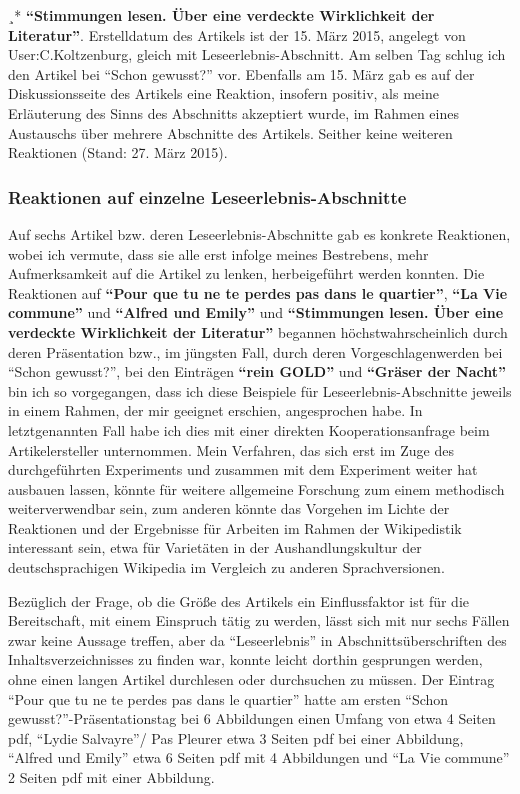 \documentclass[fontsize=12pt]{scrartcl}
\begin{document}
¸* \textbf{"`Stimmungen lesen. \"Uber eine verdeckte Wirklichkeit der Li\-te\-ra\-tur"'}. Erstelldatum des Artikels ist der 15. M\"arz 2015, angelegt von \mbox{User}:C.Kolt\-zen\-burg, gleich mit Leseerlebnis-Abschnitt. Am selben Tag schlug ich den Artikel bei "`Schon gewusst?"' vor. Ebenfalls am 15. M\"arz gab es auf der Dis\-kus\-si\-onsseite des Artikels eine Reaktion, insofern positiv, als meine Erl\"auterung des Sinns des Abschnitts akzeptiert wurde, im Rahmen eines Austauschs \"uber meh\-rere Abschnitte des Artikels. Seither keine weiteren Reaktionen (Stand: 27. M\"arz 2015).

\pagebreak
\subsubsection{Reaktionen auf einzelne Leseerlebnis-Abschnitte}
\label{subsubsec:6.2.1}

Auf sechs Artikel bzw. deren Leseerlebnis-Abschnitte gab es konkrete Reaktionen, wobei ich vermute, dass sie alle erst infolge meines Bestrebens, mehr Aufmerksamkeit auf die Artikel zu lenken, herbeigef\"uhrt werden konnten. Die Reaktionen auf \textbf{"`Pour que tu ne te perdes pas dans le quartier"'}, \textbf{"`La Vie commune"'} und \textbf{"`Alfred und Emily"'} und \textbf{"`Stimmungen lesen. \"Uber eine verdeckte Wirklichkeit der Li\-te\-ra\-tur"'} begannen h\"ochstwahrscheinlich durch deren Pr\"asentation bzw., im j\"ungsten Fall, durch deren Vorgeschlagenwerden bei "`Schon gewusst?"', bei den Eintr\"agen \textbf{"`rein GOLD"'} und \textbf{"`Gr\"aser der Nacht"'} bin ich so vorgegangen, dass ich diese Beispiele f\"ur Leseerlebnis-Abschnitte jeweils in einem Rahmen, der mir ge\-eig\-net erschien, an\-ge\-spro\-chen habe. In letztgenannten Fall habe ich dies mit einer direkten Kooperationsanfrage beim Artikelersteller\textsuperscript{\tiny *} unternommen. Mein Verfahren, das sich erst im Zuge des durchgef\"uhrten Experiments und zusammen mit dem Experiment weiter hat ausbauen lassen, k\"onnte f\"ur weitere allgemeine For\-schung zum einem methodisch weiterverwendbar sein, zum anderen k\"onnte das Vorgehen im Lichte der Reaktionen und der Ergebnisse f\"ur Arbei\-ten im Rahmen der Wikipedistik interessant sein, etwa f\"ur Variet\"aten in der Aushandlungskultur der deutschspra\-chi\-gen Wi\-ki\-pe\-dia im Vergleich zu anderen Sprachversionen.

Bez\"uglich der Frage, ob die Gr\"o{\ss}e des Artikels ein Einflussfaktor ist f\"ur die Be\-reit\-schaft, mit einem Einspruch t\"atig zu werden, l\"asst sich mit nur sechs F\"allen zwar keine Aussage treffen, aber da "`Leseerlebnis"' in Abschnitts\"uberschriften des Inhaltsverzeichnisses zu finden war, konnte leicht dorthin gesprungen werden, ohne einen langen Artikel durchlesen oder durchsuchen zu m\"ussen. Der Eintrag "`Pour que tu ne te perdes pas dans le quartier"' hatte am ersten "`Schon gewusst?"'-Pr\"asentationstag bei 6 Abbildungen einen Umfang von etwa 4 Sei\-ten pdf, "`Lydie Salvayre"'/ Pas Pleurer etwa 3 Sei\-ten pdf bei einer Abbildung, "`Alfred und Emily"' etwa 6 Sei\-ten pdf mit 4 Abbildungen und "`La Vie commune"' 2 Sei\-ten pdf mit einer Abbildung.\newline
\end{document}
